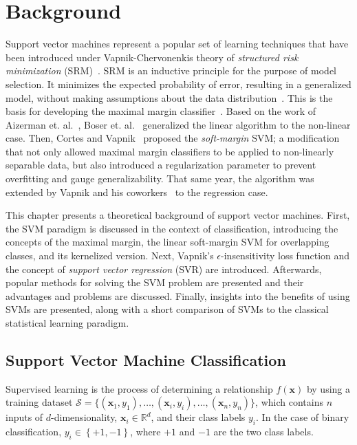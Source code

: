 \documentclass[reqno]{vcuthesis}
\newcommand{\set}[1]{{\left\{#1\right\}}}
\newcommand{\reals}{{\mathbb{R}}}
\numberwithin{equation}{chapter}
\begin{document}
\chapter{Background}\label{chap:background}
Support vector machines represent a popular set of learning techniques that have been introduced under Vapnik-Chervonenkis theory of \textit{structured risk minimization} (SRM)~\cite{boser1992training,Cortes1995,Kecman2001,Schoelkopf2002,Shalev2014}. SRM is an inductive principle for the purpose of model selection. It minimizes the expected probability of error, resulting in a generalized model, without making assumptions about the data distribution~\cite{Shalev2014,vapnik2015uniform}. This is the basis for developing the maximal margin classifier~\cite{vapnik2015uniform}. Based on the work of Aizerman et. al.~\cite{Aizerman67theoretical}, Boser et. al.~\cite{boser1992training} generalized the linear algorithm to the non-linear case. Then, Cortes and Vapnik~\cite{Cortes1995} proposed the \textit{soft-margin} SVM; a modification that not only allowed maximal margin classifiers to be applied to non-linearly separable data, but also introduced a regularization parameter to prevent overfitting and gauge generalizability. That same year, the algorithm was extended by Vapnik and his coworkers~\cite{vapnik2013nature} to the regression case.

This chapter presents a theoretical background of support vector machines. First, the SVM paradigm is discussed in the context of classification, introducing the concepts of the maximal margin, the linear soft-margin SVM for overlapping classes, and its kernelized version. Next, Vapnik's $\epsilon$-insensitivity loss function and the concept of \textit{support vector regression} (SVR) are introduced. Afterwards, popular methods for solving the SVM problem are presented and their advantages and problems are discussed. Finally, insights into the benefits of using SVMs are presented, along with a short comparison of SVMs to the classical statistical learning paradigm.
\newpage
\section{Support Vector Machine Classification}
Supervised learning is the process of determining a relationship $f(\bm x)$ by using a training dataset $\mathcal{S} = \{(\bm{x}_1,y_1),\ldots,(\bm{x}_i,y_i),\ldots,(\bm{x}_n,y_n)\}$, which contains $n$ inputs of $d$-dimensionality, $\bm x_i \in \reals^d$, and their class labels $y_i$. In the case of binary classification, $y_i \in \set{+1,-1}$, where $+1$ and $-1$ are the two class labels.
\end{document}
